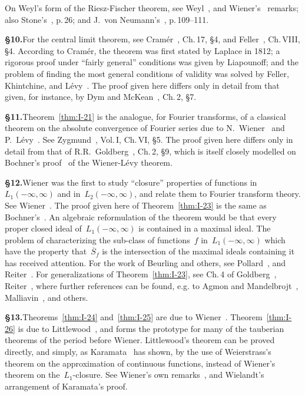 \noindent On Weyl's form of the Riesz-Fischer theorem, see Weyl~\cite{weyl1909}, and Wiener's~\cite{wiener1933} remarks; also Stone's~\cite{stone1932}, p.\,26; and J.~von Neumann's~\cite{neumann1929}, p.\,109--111.

\noindent\textbf{§10.}\quad For the central limit theorem, see Cram\'er~\cite{cramer1946}, Ch.\,17, §4, and Feller~\cite{feller1950}, Ch.\,VIII, §4. According to Cram\'er, the theorem was first stated by Laplace in 1812; a rigorous proof under ``fairly general'' conditions was given by Liapounoff; and the problem of finding the most general conditions of validity was solved by Feller, Khintchine, and L\'evy~\cite{levy1934}. The proof given here differs only in detail from that given, for instance, by Dym and McKean~\cite{dymmckean1972}, Ch.\,2, §7.

\noindent\textbf{§11.}\quad Theorem~\ref{thm:I-21} is the analogue, for Fourier transforms, of a classical theorem on the absolute convergence of Fourier series due to N.~Wiener~\cite{wiener1930} and P.~L\'evy~\cite{levy1934}. See Zygmund~\cite{zygmund1959}, Vol.\,I, Ch.\,VI, §5. The proof given here differs only in detail from that of R.R.~Goldberg~\cite{goldberg1961}, Ch.\,2, §9, which is itself closely modelled on Bochner's proof~\cite{bochner1936a} of the Wiener-L\'evy theorem.

\noindent\textbf{§12.}\quad Wiener was the first to study ``closure'' properties of functions in~$L_1(-\infty,\infty)$ and in~$L_2(-\infty,\infty)$, and relate them to Fourier transform theory. See Wiener~\cite{wiener1930}. The proof given here of Theorem~\ref{thm:I-23} is the same as Bochner's~\cite{bochner1936a}. An algebraic reformulation of the theorem would be that every proper closed ideal of~$L_1(-\infty,\infty)$ is contained in a maximal ideal. The problem of characterizing the sub-class of functions~$f$ in~$L_1(-\infty,\infty)$ which have the property that~$\overline{S}_f$ is the intersection of the maximal ideals containing it has received attention. For the work of Beurling and others, see Pollard~\cite{pollard1953}, and Reiter~\cite{reiter1968}. For generalizations of Theorem~\ref{thm:I-23}, see Ch.\,4 of Goldberg~\cite{goldberg1961}, Reiter~\cite{reiter1968}, where further references can be found, e.g. to Agmon and Mandelbrojt~\cite{agmonmandelbrojt1950}, Malliavin~\cite{malliavin1959}, and others.

\noindent\textbf{§13.}\quad Theorems~\ref{thm:I-24} and~\ref{thm:I-25} are due to Wiener~\cite{wiener1930}. Theorem~\ref{thm:I-26} is due to Littlewood~\cite{littlewood1910}, and forms the prototype for many of the tauberian theorems of the period before Wiener. Littlewood's theorem can be proved directly, and simply, as Karamata~\cite{karamata1930} has shown, by the use of Weierstrass's theorem on the approximation of continuous functions, instead of Wiener's theorem on the~$L_1$-closure. See Wiener's own remarks~\cite{wiener1933}, and Wielandt's~\cite{wielandt1952} arrangement of Karamata's proof.

